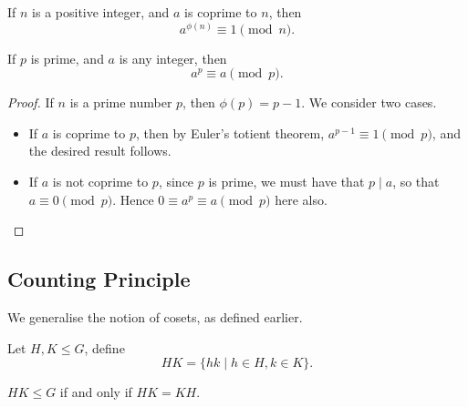 \begin{theorem}[Euler]
If $n$ is a positive integer, and $a$ is coprime to $n$, then
\[a^{\phi(n)}\equiv1\pmod n.\]
\end{theorem}

\begin{theorem}[Fermat]
If $p$ is prime, and $a$ is any integer, then
\[a^p\equiv a\pmod p.\]
\end{theorem}

\begin{proof}
If $n$ is a prime number $p$, then $\phi(p)=p-1$. We consider two cases.
\begin{itemize}
\item If $a$ is coprime to $p$, then by Euler's totient theorem, $a^{p-1}\equiv1\pmod p$, and the desired result follows.
\item If $a$ is not coprime to $p$, since $p$ is prime, we must have that $p\mid a$, so that $a\equiv0\pmod p$. Hence $0\equiv a^p\equiv a\pmod p$ here also.
\end{itemize}
\end{proof}

\subsection{Counting Principle}
We generalise the notion of cosets, as defined earlier.

\begin{definition}
Let $H,K\le G$, define
\[HK=\{hk\mid h\in H,k\in K\}.\]
\end{definition}

\begin{lemma}
$HK\le G$ if and only if $HK=KH$.
\end{lemma}

